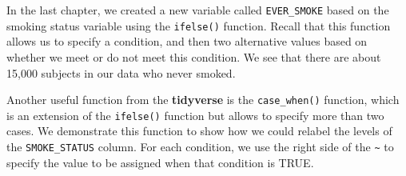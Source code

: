 \documentclass[
  letterpaper,
]{latex/krantz}
\makeatletter
\newenvironment{Shaded}{\begin{snugshade}}{\end{snugshade}}
\newcommand{\CommentTok}[1]{\textcolor[rgb]{0.37,0.37,0.37}{#1}}
\newcommand{\FunctionTok}[1]{\textcolor[rgb]{0.28,0.35,0.67}{#1}}
\newcommand{\NormalTok}[1]{\textcolor[rgb]{0.00,0.23,0.31}{#1}}
\newcommand{\SpecialCharTok}[1]{\textcolor[rgb]{0.37,0.37,0.37}{#1}}
\newcommand{\StringTok}[1]{\textcolor[rgb]{0.13,0.47,0.30}{#1}}
\newenvironment{kframe}{%
\medskip{}
\setlength{\fboxsep}{.8em}
 \def\at@end@of@kframe{}%
 \ifinner\ifhmode%
  \def\at@end@of@kframe{\end{minipage}}%
  \begin{minipage}{\columnwidth}%
 \fi\fi%
 \def\FrameCommand##1{\hskip\@totalleftmargin \hskip-\fboxsep
 \colorbox{shadecolor}{##1}\hskip-\fboxsep
     \hskip-\linewidth \hskip-\@totalleftmargin \hskip\columnwidth}%
 \MakeFramed {\advance\hsize-\width
   \@totalleftmargin\z@ \linewidth\hsize
   \@setminipage}}%
 {\par\unskip\endMakeFramed%
 \at@end@of@kframe}
\renewenvironment{Shaded}{\begin{kframe}}{\end{kframe}}
\makeatother
\begin{document}
In the last chapter, we created a new variable called
\texttt{EVER\_SMOKE} based on the smoking status variable using the
\texttt{ifelse()}
function. Recall that this function allows us to specify a condition,
and then two alternative values based on whether we meet or do not meet
this condition. We see that there are about 15,000 subjects in our data
who never smoked.

\begin{Shaded}
\end{Shaded}

Another useful function from the \textbf{tidyverse} is the
\texttt{case\_when()}
function, which is an extension of the \texttt{ifelse()} function but
allows to specify more than two cases. We demonstrate this function to
show how we could relabel the levels of the \texttt{SMOKE\_STATUS}
column. For each condition, we use the right side of the
\texttt{\textasciitilde{}} to specify the value to be assigned when that
condition is TRUE.

\begin{Shaded}
\end{Shaded}
\end{document}
